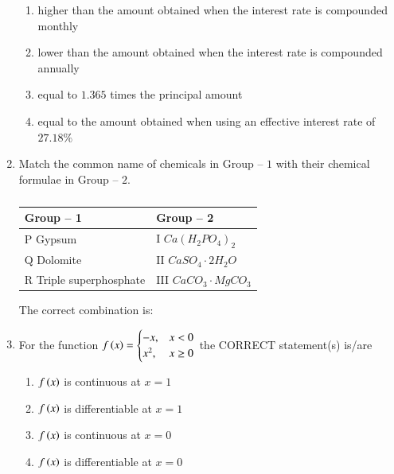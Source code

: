 \documentclass[journal,12pt,onecolumn]{IEEEtran}
\theoremstyle{remark}
\begin{document}
\begin{enumerate}
\begin{enumerate}
\item higher than the amount obtained when the interest rate is compounded monthly
\item lower than the amount obtained when the interest rate is compounded annually
\item equal to $1.365$ times the principal amount
\item equal to the amount obtained when using an effective interest rate of $27.18\%$
\end{enumerate}

\item Match the common name of chemicals in Group -- $1$ with their chemical formulae in Group -- $2$.

\hfill{}

\begin{table}[h!]
\centering
\begin{tabular}{|l|l|}
\hline
Group -- 1 & Group -- 2 \\
\hline
P Gypsum & I $Ca(H_2PO_4)_2$ \\
\hline
Q Dolomite & II $CaSO_4 \cdot 2H_2O$ \\
\hline
R Triple superphosphate & III $CaCO_3 \cdot MgCO_3$ \\
\hline
\end{tabular}
\caption*{}
\label{tab:Q15}
\end{table}

The correct combination is:
\begin{enumerate}
\end{enumerate}

\item For the function $f\left(x\right) = \begin{cases} -x, & x < 0 \\ x^2, & x \ge 0 \end{cases}$ the CORRECT statement(s) is/are

\hfill{}

\begin{enumerate}
\item $f\left(x\right)$ is continuous at $x=1$
\item $f\left(x\right)$ is differentiable at $x=1$
\item $f\left(x\right)$ is continuous at $x=0$
\item $f\left(x\right)$ is differentiable at $x=0$
\end{enumerate}


\end{enumerate}
\end{document}
